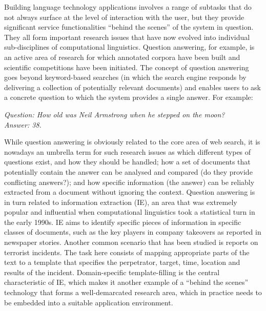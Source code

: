 \documentclass{../../metanetpaper}
\begin{document}
\begin{multicols}{2}
Building language technology applications involves a range of subtasks that do not always surface at the level of interaction with the user, but they provide significant service functionalities “behind the scenes” of the system in question. They all form important research issues that have now evolved into individual sub-disciplines of computational linguistics.  Question answering, for example, is an active area of research for which annotated corpora have been built and scientific competitions have been initiated. The concept of question answering goes beyond keyword-based searches (in which the search engine responds by delivering a collection of potentially relevant documents) and enables users to ask a concrete question to which the system provides a single answer. For example:

\textit{Question: How old was Neil Armstrong when he stepped on the moon?}\\
\textit{Answer: 38.}

While question answering is obviously related to the core area of web search, it is nowadays an umbrella term for such research issues as which different types of questions exist, and how they should be handled; how a set of documents that potentially contain the answer can be analysed and compared (do they provide conflicting answers?); and how specific information (the answer) can be reliably extracted from a document without ignoring the context. 
Question answering is in turn related to information extraction (IE), an area that was extremely popular and influential when computational linguistics took a statistical turn in the early 1990s. IE aims to identify specific pieces of information in specific classes of documents, such as the key players in company takeovers as reported in newspaper stories. Another common scenario that has been studied is reports on terrorist incidents. The task here consists of mapping appropriate parts of the text to a template that specifies the perpetrator, target, time, location and results of the incident. Domain-specific template-filling is the central characteristic of IE, which makes it another example of a “behind the scenes” technology that forms a well-demarcated research area, which in practice needs to be embedded into a suitable application environment. 


\end{multicols}
\end{document}
